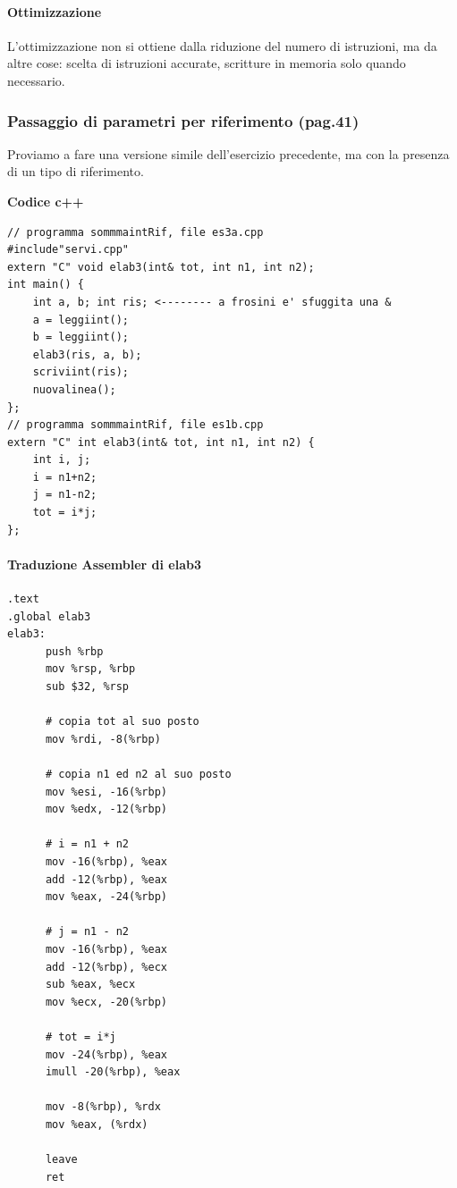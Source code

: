 \documentclass[11pt]{report}
\theoremstyle{definition}
\begin{document}
\paragraph{Ottimizzazione} 
L'ottimizzazione non si ottiene dalla riduzione del numero di istruzioni, ma da altre cose: scelta di istruzioni accurate, scritture in memoria solo quando necessario.

\subsubsection{Passaggio di parametri per riferimento (pag.41)}
Proviamo a fare una versione simile dell'esercizio precedente, ma con la presenza di un tipo di riferimento.
\begin{framed}
\noindent \textbf{Codice c++}
\begin{verbatim}
// programma sommmaintRif, file es3a.cpp
#include"servi.cpp"
extern "C" void elab3(int& tot, int n1, int n2);
int main() { 
    int a, b; int ris; <-------- a frosini e' sfuggita una &
    a = leggiint();
    b = leggiint();
    elab3(ris, a, b);
    scriviint(ris);
    nuovalinea();
};
// programma sommmaintRif, file es1b.cpp
extern "C" int elab3(int& tot, int n1, int n2) { 
    int i, j;
    i = n1+n2;
    j = n1-n2;
    tot = i*j;
};
\end{verbatim}
\end{framed}
\paragraph{Traduzione Assembler di elab3}
\begin{verbatim}
.text
.global elab3
elab3:
      push %rbp
      mov %rsp, %rbp
      sub $32, %rsp
      
      # copia tot al suo posto
      mov %rdi, -8(%rbp)
      
      # copia n1 ed n2 al suo posto
      mov %esi, -16(%rbp)
      mov %edx, -12(%rbp)
      
      # i = n1 + n2
      mov -16(%rbp), %eax
      add -12(%rbp), %eax
      mov %eax, -24(%rbp)
      
      # j = n1 - n2
      mov -16(%rbp), %eax
      add -12(%rbp), %ecx
      sub %eax, %ecx
      mov %ecx, -20(%rbp)
      
      # tot = i*j
      mov -24(%rbp), %eax
      imull -20(%rbp), %eax
      
      mov -8(%rbp), %rdx
      mov %eax, (%rdx)
      
      leave
      ret
\end{verbatim}
\end{document}
